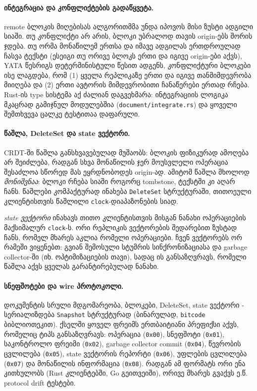 \paragraph{ინტეგრაცია და კონფლიქტების გადაწყვეტა.}
remote ბლოკის მიღებისას ალგორითმმა უნდა იპოვოს მისი ზუსტი ადგილი
სიაში. თუ კონფლიქტი არ არის, ბლოკი უბრალოდ თავის origin-ებს შორის ჯდება.
თუ ორმა მონაწილემ ერთსა და იმავე ადგილას ერთდროულად ჩასვა ტექსტი
(ესეიგი თუ ორივე ბლოკს ერთი და იგივე origin-ები აქვს), YATA წესრიგს დეტერმინისტული
წესით ადგენს, კონფლიქტური ბლოკები ისე ლაგდება, რომ (1) ყველა რეპლიკაზე
ერთი და იგივე თანმიმდევრობა მიიღება და (2) ერთი ავტორის მიმდევრობითი
ჩანაწერები ერთად რჩება. Rust-ის type სისტემა აქ
ძალიან დაგვეხმარა: ინტეგრაციის ლოგიკა მკაცრად გამიჯნულ მოდულებშია
(\texttt{document/integrate.rs}) და ყოველი შემთხვევა ცალკე
ტესტითაა დაფარული.

\paragraph{წაშლა, DeleteSet და state ვექტორი.}
CRDT-ში წაშლა განსხვავებულად მუშაობს: ბლოკის ფიზიკურად ამოღება არ
შეიძლება, რადგან სხვა მონაწილის ჯერ მოუსვლელი ოპერაცია შესაძლოა სწორედ
მას ეყრდნობოდეს origin-ად. ამიტომ წაშლა მხოლოდ \emph{მონიშვნაა}: ბლოკი
რჩება სიაში როგორც tombstone, ტექსტში კი აღარ ჩანს.
წაშლები კომპაქტურად ინახება \texttt{DeleteSet} სტრუქტურაში, თითოეული
კლიენტისთვის წაშლილი \texttt{clock}-დიაპაზონების სიად.

\emph{state ვექტორი} ინახავს თითო კლიენტისთვის მისგან ნანახი ოპერაციების
მაქსიმალურ \texttt{clock}-ს. ორი რეპლიკის ვექტორების შედარებით ზუსტად ჩანს, რომელ
მხარეს აკლია რომელი ოპერაციები. ჩვენ ვექტორებს ორ რამეში ვიყენებთ:
გვიან შემოსული სტუმრის სინქრონიზაციასა და garbage collector-ში (იხ.
ოპტიმიზაციების თავი), სადაც ის განსაზღვრავს, რომელი წაშლა აქვს ყველას
გარანტირებულად ნანახი.

\paragraph{სნეფშოტები და wire პროტოკოლი.}
დოკუმენტის სრული მდგომარეობა, ბლოკები, DeleteSet, state ვექტორი -
სერიალიზდება \texttt{Snapshot} სტრუქტურად (ბინარულად, \texttt{bitcode}
ბიბლიოთეკით). ქსელში ყოველ ფრეიმს ერთბაიტიანი პრეფიქსი აქვს, რომელიც
ტიპს განსაზღვრავს: ოპერაცია (\texttt{0x00}), სნეფშოტი (\texttt{0x01}),
საკონტროლო ფრეიმი (\texttt{0x02}), garbage collector commit
(\texttt{0x04}), წევრობის ცვლილება (\texttt{0x05}), state ვექტორის
რეპორტი (\texttt{0x06}), უფლების ცვლილება (\texttt{0x07}) და მონაწილის
ინფორმაცია (\texttt{0x08}). რადგან ამ ფორმატს ორი ენა კითხულობს (Rust
კლიენტებში, Go გეითვეიში), ორივე მხარეს გვაქვს ე.წ. protocol drift
ტესტები.

